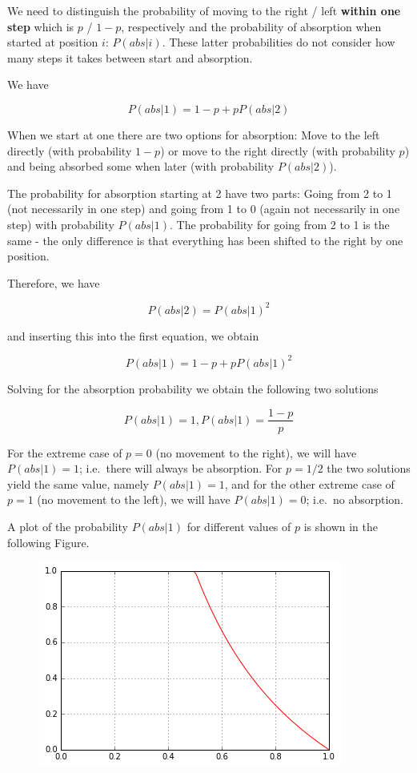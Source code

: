 
We need to distinguish the probability of moving to the right / left \textbf{within one step} which is \(p\) / \(1-p\), respectively and the probability of absorption when started at position \(i\): \(P(abs|i)\). These latter probabilities do not consider how many steps it takes between start and absorption.

We have

\[
P(abs|1) = 1 - p + p P(abs|2)
\]

When we start at one there are two options for absorption: Move to the left directly (with probability \(1-p\)) or move to the right directly (with probability \(p\)) and being absorbed some when later (with probability \(P(abs|2)\)).

The probability for absorption starting at 2 have two parts: Going from 2 to 1 (not necessarily in one step) and going from 1 to 0 (again not necessarily in one step) with probability \(P(abs|1)\). The probability for going from 2 to 1 is the same - the only difference is that everything has been shifted to the right by one position.

Therefore, we have

\[
P(abs|2) = P(abs|1)^2
\]

and inserting this into the first equation, we obtain

\[
P(abs|1) = 1 - p + p P(abs|1)^2
\]

Solving for the absorption probability we obtain the following two solutions

\[
P(abs|1) = 1, P(abs|1) = \frac{1-p}{p}
\]

For the extreme case of \(p=0\) (no movement to the right), we will have \(P(abs|1) = 1\); i.e.~there will always be absorption. For \(p=1/2\) the two solutions yield the same value, namely \(P(abs|1) = 1\), and for the other extreme case of \(p=1\) (no movement to the left), we will have \(P(abs|1) = 0\); i.e.~no absorption.

A plot of the probability \(P(abs|1)\) for different values of \(p\) is shown in the following Figure.

\begin{figure}
\centering
\includegraphics{images/cliffhanger.png}
\end{figure}

